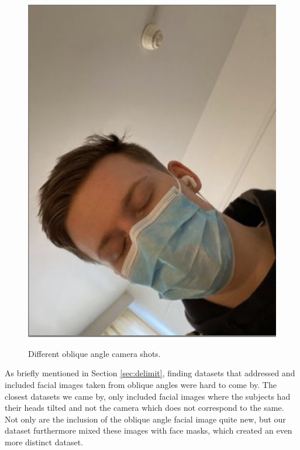 \begin{figure}[h]
        {\includegraphics[scale = 0.295]{figures/0699.png}\hspace{0.4cm}}
    \caption{Different oblique angle camera shots.}
    \label{fig:tilt}
\end{figure}

As briefly mentioned in Section \ref{sec:delimit}, finding datasets that addressed and included facial images taken from oblique angles were hard to come by. The closest datasets we came by, only included facial images where the subjects had their heads tilted and not the camera which does not correspond to the same. Not only are the inclusion of the oblique angle facial image quite new, but our dataset furthermore mixed these images with face masks, which created an even more distinct dataset. 

